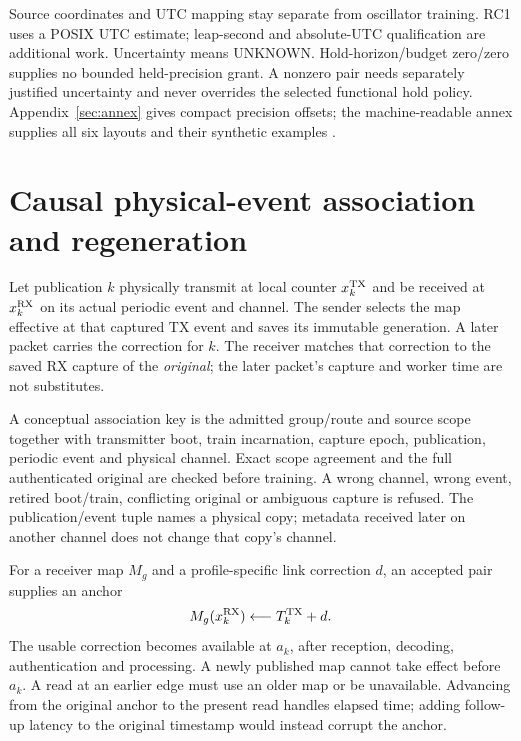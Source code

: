 \documentclass[11pt,letterpaper]{article}
\begin{document}
Source coordinates and UTC mapping stay separate from oscillator training. RC1 uses a POSIX UTC estimate; leap-second and absolute-UTC qualification are additional work. Uncertainty  means UNKNOWN. Hold-horizon/budget zero/zero supplies no bounded held-precision grant. A nonzero pair needs separately justified uncertainty and never overrides the selected functional hold policy. Appendix~\ref{sec:annex} gives compact precision offsets; the machine-readable annex supplies all six layouts and their synthetic examples \cite{v14}.

\section{Causal physical-event association and regeneration}\label{sec:causal}
Let publication $k$ physically transmit at local counter $x_k^{\rm TX}$ and be received at $x_k^{\rm RX}$ on its actual periodic event and channel. The sender selects the map effective at that captured TX event and saves its immutable generation. A later packet carries the correction for $k$. The receiver matches that correction to the saved RX capture of the \emph{original}; the later packet's capture and worker time are not substitutes.

A conceptual association key is the admitted group/route and source scope together with transmitter boot, train incarnation, capture epoch, publication, periodic event and physical channel. Exact scope agreement and the full authenticated original are checked before training. A wrong channel, wrong event, retired boot/train, conflicting original or ambiguous capture is refused. The publication/event tuple names a physical copy; metadata received later on another channel does not change that copy's channel.

For a receiver map $M_g$ and a profile-specific link correction $d$, an accepted pair supplies an anchor
\begin{equation}
 M_g(x_k^{\rm RX}) \longleftarrow T_k^{\rm TX}+d .\label{eq:anchor}
\end{equation}
The usable correction becomes available at $a_k$, after reception, decoding, authentication and processing. A newly published map cannot take effect before $a_k$. A read at an earlier edge must use an older map or be unavailable. Advancing from the original anchor to the present read handles elapsed time; adding follow-up latency to the original timestamp would instead corrupt the anchor.
\end{document}
